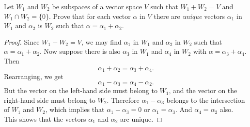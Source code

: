  Let $W_1$ and $W_2$ be subspaces of a vector space $V$ such
that $W_1 + W_2 = V$ and $W_1\cap W_2 = \{0\}$. Prove that for each
vector $\alpha$ in $V$ there are {\em unique} vectors $\alpha_1$ in
$W_1$ and $\alpha_2$ is $W_2$ such that
$\alpha = \alpha_1 + \alpha_2$.
\begin{proof}
  Since $W_1 + W_2 = V$, we may find $\alpha_1$ in $W_1$ and
  $\alpha_2$ in $W_2$ such that $\alpha = \alpha_1 + \alpha_2$. Now
  suppose there is also $\alpha_3$ in $W_1$ and $\alpha_4$ in $W_2$
  with $\alpha = \alpha_3 + \alpha_4$. Then
  \begin{equation*}
    \alpha_1 + \alpha_2 = \alpha_3 + \alpha_4.
  \end{equation*}
  Rearranging, we get
  \begin{equation*}
    \alpha_1 - \alpha_3 = \alpha_4 - \alpha_2.
  \end{equation*}
  But the vector on the left-hand side must belong to $W_1$, and the
  vector on the right-hand side must belong to $W_2$. Therefore
  $\alpha_1 - \alpha_3$ belongs to the intersection of $W_1$ and
  $W_2$, which implies that $\alpha_1 - \alpha_3 = 0$ or
  $\alpha_1 = \alpha_3$. And $\alpha_4 = \alpha_2$ also. This shows
  that the vectors $\alpha_1$ and $\alpha_2$ are unique.
\end{proof}
